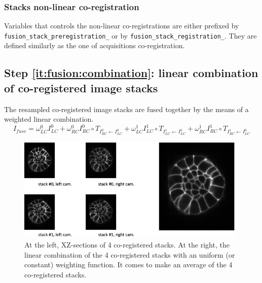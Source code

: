 \subsubsection{Stacks non-linear co-registration}
\label{sec:cli:fuse:stack:registration}
Variables that controls the non-linear co-registrations are either prefixed by \texttt{fusion\_stack\_preregistration\_} or by \texttt{fusion\_stack\_registration\_}. They are defined similarly as the one of acquisitions co-registration. 






\subsection{Step \ref{it:fusion:combination}: linear combination of co-registered image stacks}
\label{sec:cli:fuse:stack:fusion}

The resampled co-registered image stacks are fused together by the means of a weighted linear combination.
\begin{displaymath}
I_{fuse} =
\omega^{0}_{LC} I^{0}_{LC}
+ \omega^{0}_{RC} I^{0}_{RC} \circ T_{I^{0}_{RC} \leftarrow I^{0}_{LC}}
+ \omega^{1}_{LC} I^{1}_{LC} \circ T_{I^{1}_{LC} \leftarrow I^{0}_{LC}}
+ \omega^{1}_{RC} I^{1}_{RC} \circ T_{I^{1}_{RC} \leftarrow I^{0}_{LC}}
\end{displaymath}



\begin{figure}
\begin{center}
\includegraphics[height=50mm]{figures/fusion-uniform-combination.png}
\end{center}
\caption{\label{fig:cli:fuse:uniform:combination} At the left, XZ-sections of 4 co-registered stacks. 
At the right, the linear combination of the 4 co-registered stacks with an uniform (or constant) weighting function. It comes to make an average of the 4 co-registered stacks.}
\end{figure}

